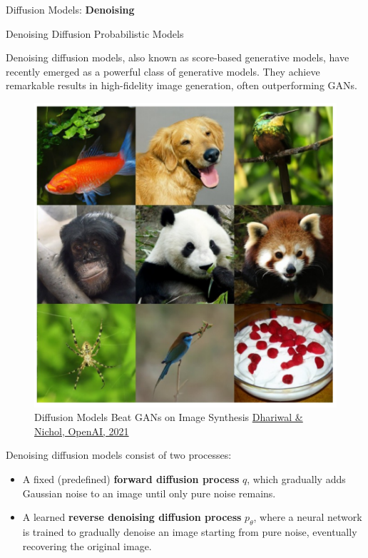 \begin{frame}{}
    \LARGE Diffusion Models: \textbf{Denoising}
\end{frame}

\begin{frame}[allowframebreaks]{Denoising Diffusion Probabilistic Models}
    
Denoising diffusion models, also known as score-based generative models, have recently emerged as a powerful class of generative models. They achieve remarkable results in high-fidelity image generation, often outperforming GANs.
\begin{figure}
    \centering
    \includegraphics[height=0.5\textheight, width=\textwidth, keepaspectratio]{images/diffusion/diff_results_1.png}
    \caption*{Diffusion Models Beat GANs on Image Synthesis \href{https://arxiv.org/abs/2105.05233}{Dhariwal \& Nichol, OpenAI, 2021}}
\end{figure}

\framebreak
Denoising diffusion models consist of two processes:
\begin{itemize}
    \item A fixed (predefined) \textbf{forward diffusion process} $q$, which gradually adds Gaussian noise to an image until only pure noise remains.
    \item A learned \textbf{reverse denoising diffusion process} $p_\theta$, where a neural network is trained to gradually denoise an image starting from pure noise, eventually recovering the original image.
\end{itemize}


\end{frame}

